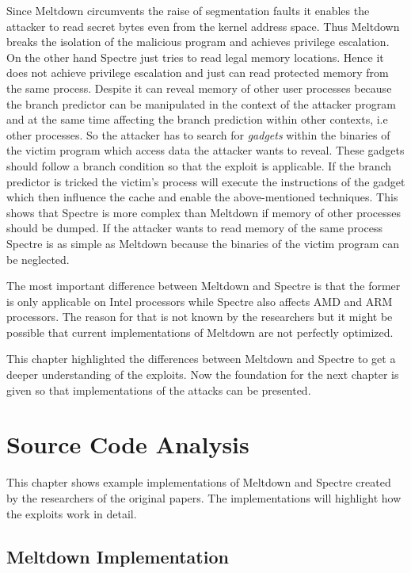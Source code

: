 \documentclass[a4paper,oneside,openright] {scrreprt}
\begin{document}
Since Meltdown circumvents the raise of segmentation faults it enables the attacker to read secret bytes even from the kernel address space.
Thus Meltdown breaks the isolation of the malicious program and achieves privilege escalation. 
On the other hand Spectre just tries to read legal memory locations. Hence it does not achieve privilege escalation and just can read
protected memory from the same process. 
Despite it can reveal memory of other user processes because the branch predictor can be manipulated in the 
context of the attacker program and at the same time affecting the branch prediction within other contexts, i.e other processes.
So the attacker has to search for \textit{gadgets} within the binaries of the victim program which access data the attacker wants to reveal.
These gadgets should follow a branch condition so that the exploit is applicable.
If the branch predictor is tricked the victim's process will execute the instructions of the gadget which then influence the cache 
and enable the above-mentioned techniques. 
This shows that Spectre is more complex than Meltdown if memory of other processes should be dumped. 
If the attacker wants to read memory of the same process Spectre is as simple as Meltdown because the binaries of the victim program
can be neglected.

The most important difference between Meltdown and Spectre is that the former is only applicable on Intel processors while Spectre 
also affects AMD and ARM processors. The reason for that is not known by the researchers but it might be possible that current 
implementations of Meltdown are not perfectly optimized.

This chapter highlighted the differences between Meltdown and Spectre to get a deeper understanding of the exploits.
Now the foundation for the next chapter is given so that implementations of the attacks can be presented.

\chapter{Source Code Analysis}
\label{ch:sourceCodeAnalysis}

This chapter shows example implementations of Meltdown and Spectre created by the researchers of the original papers.
The implementations will highlight how the exploits work in detail.

\section{Meltdown Implementation}
\label{ch:intro:motivation}
\end{document}
